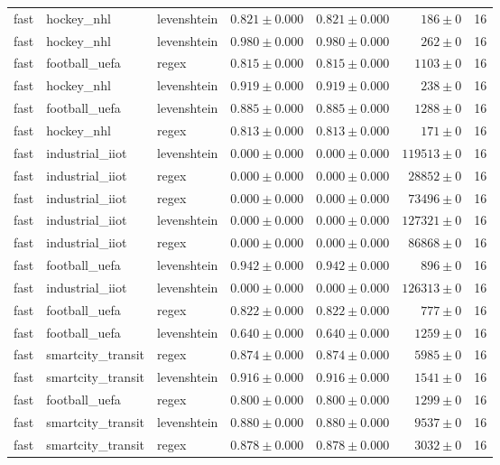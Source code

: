 \begin{table}[htbp]
\begin{tabular}{l l l r r r r}
fast & hockey\_nhl & levenshtein & $0.821\pm0.000$ & $0.821\pm0.000$ & $186\pm0$ & 16 \\
fast & hockey\_nhl & levenshtein & $0.980\pm0.000$ & $0.980\pm0.000$ & $262\pm0$ & 16 \\
fast & football\_uefa & regex & $0.815\pm0.000$ & $0.815\pm0.000$ & $1103\pm0$ & 16 \\
fast & hockey\_nhl & levenshtein & $0.919\pm0.000$ & $0.919\pm0.000$ & $238\pm0$ & 16 \\
fast & football\_uefa & levenshtein & $0.885\pm0.000$ & $0.885\pm0.000$ & $1288\pm0$ & 16 \\
fast & hockey\_nhl & regex & $0.813\pm0.000$ & $0.813\pm0.000$ & $171\pm0$ & 16 \\
fast & industrial\_iiot & levenshtein & $0.000\pm0.000$ & $0.000\pm0.000$ & $119513\pm0$ & 16 \\
fast & industrial\_iiot & regex & $0.000\pm0.000$ & $0.000\pm0.000$ & $28852\pm0$ & 16 \\
fast & industrial\_iiot & regex & $0.000\pm0.000$ & $0.000\pm0.000$ & $73496\pm0$ & 16 \\
fast & industrial\_iiot & levenshtein & $0.000\pm0.000$ & $0.000\pm0.000$ & $127321\pm0$ & 16 \\
fast & industrial\_iiot & regex & $0.000\pm0.000$ & $0.000\pm0.000$ & $86868\pm0$ & 16 \\
fast & football\_uefa & levenshtein & $0.942\pm0.000$ & $0.942\pm0.000$ & $896\pm0$ & 16 \\
fast & industrial\_iiot & levenshtein & $0.000\pm0.000$ & $0.000\pm0.000$ & $126313\pm0$ & 16 \\
fast & football\_uefa & regex & $0.822\pm0.000$ & $0.822\pm0.000$ & $777\pm0$ & 16 \\
fast & football\_uefa & levenshtein & $0.640\pm0.000$ & $0.640\pm0.000$ & $1259\pm0$ & 16 \\
fast & smartcity\_transit & regex & $0.874\pm0.000$ & $0.874\pm0.000$ & $5985\pm0$ & 16 \\
fast & smartcity\_transit & levenshtein & $0.916\pm0.000$ & $0.916\pm0.000$ & $1541\pm0$ & 16 \\
fast & football\_uefa & regex & $0.800\pm0.000$ & $0.800\pm0.000$ & $1299\pm0$ & 16 \\
fast & smartcity\_transit & levenshtein & $0.880\pm0.000$ & $0.880\pm0.000$ & $9537\pm0$ & 16 \\
fast & smartcity\_transit & regex & $0.878\pm0.000$ & $0.878\pm0.000$ & $3032\pm0$ & 16 \\

\end{tabular}
\end{table}
